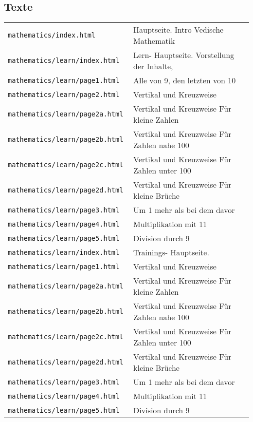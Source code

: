 \subsection{Texte}
\begin{tabular}{ | l | l | } 
  \texttt{mathematics/index.html        } & Hauptseite. Intro Vedische Mathematik \\
  \texttt{mathematics/learn/index.html  } & Lern- Hauptseite. Vorstellung der Inhalte, \\
  \texttt{mathematics/learn/page1.html  } & Alle von 9, den letzten von 10 \\
  \texttt{mathematics/learn/page2.html  } & Vertikal und Kreuzweise \\
  \texttt{mathematics/learn/page2a.html } & Vertikal und Kreuzweise Für kleine Zahlen \\
  \texttt{mathematics/learn/page2b.html } & Vertikal und Kreuzweise Für Zahlen nahe 100 \\
  \texttt{mathematics/learn/page2c.html } & Vertikal und Kreuzweise Für Zahlen unter 100 \\
  \texttt{mathematics/learn/page2d.html } & Vertikal und Kreuzweise Für kleine Brüche \\
  \texttt{mathematics/learn/page3.html  } & Um 1 mehr als bei dem davor \\
  \texttt{mathematics/learn/page4.html  } & Multiplikation mit 11 \\
  \texttt{mathematics/learn/page5.html  } & Division durch 9 \\
  \texttt{mathematics/learn/index.html  } & Trainings- Hauptseite. \\
  \texttt{mathematics/learn/page1.html  } & Vertikal und Kreuzweise \\
  \texttt{mathematics/learn/page2a.html } & Vertikal und Kreuzweise Für kleine Zahlen \\
  \texttt{mathematics/learn/page2b.html } & Vertikal und Kreuzweise Für Zahlen nahe 100 \\
  \texttt{mathematics/learn/page2c.html } & Vertikal und Kreuzweise Für Zahlen unter 100 \\
  \texttt{mathematics/learn/page2d.html } & Vertikal und Kreuzweise Für kleine Brüche \\
  \texttt{mathematics/learn/page3.html  } & Um 1 mehr als bei dem davor \\
  \texttt{mathematics/learn/page4.html  } & Multiplikation mit 11 \\
  \texttt{mathematics/learn/page5.html  } & Division durch 9 \\
\end{tabular}


